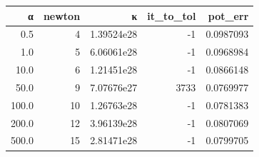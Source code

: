 \begin{tabular}{rrrrr}
  \toprule
  \textbf{α} & \textbf{newton} & \textbf{κ} & \textbf{it\_to\_tol} & \textbf{pot\_err} \\
  \midrule
  0.5 & 4 & 1.39524e28 & -1 & 0.0987093 \\
  1.0 & 5 & 6.06061e28 & -1 & 0.0968984 \\
  10.0 & 6 & 1.21451e28 & -1 & 0.0866148 \\
  50.0 & 9 & 7.07676e27 & 3733 & 0.0769977 \\
  100.0 & 10 & 1.26763e28 & -1 & 0.0781383 \\
  200.0 & 12 & 3.96139e28 & -1 & 0.0807069 \\
  500.0 & 15 & 2.81471e28 & -1 & 0.0799705 \\
  \bottomrule
\end{tabular}
